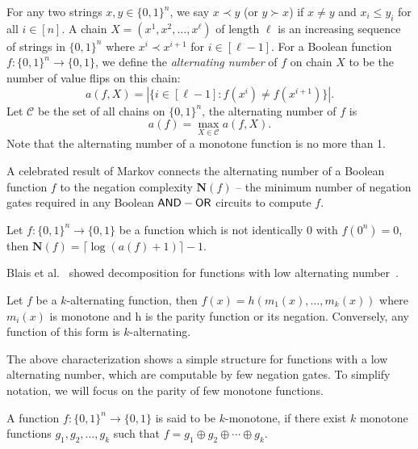 \documentclass{toc}
\newcommand{\cC}{\mathcal{C}}
\begin{document}
%
%
For any two strings $x, y \in \{0, 1\}^n$, we say $x \prec y$
(or $y \succ x$) %
%
if   %
$x \neq y$ and $x_i \le y_i$ for all $i \in [n]$. 
A chain $X = (x^1, x^2, \dots, x^\ell)$ of length $\ell$ is an increasing sequence of strings in $\{0, 1\}^n$
where $x^i \prec x^{i+1}$ for $i \in [\ell - 1]$.
For a Boolean function $f:\{0,1\}^n\rightarrow \{0, 1\}$, we define the 
\emph{alternating number} %
of $f$
on chain $X$ to be the number of value flips on this chain:
\begin{equation}
a(f, X) = \left| \{i \in [\ell - 1] : f(x^i) \neq f(x^{i+1})\}\right|.
\end{equation}
Let $\cC$ be the set of all chains on $\{0, 1\}^n$, the alternating number of $f$ is
\begin{equation}
a(f) = \max_{X \in \cC} a(f, X).
\end{equation}
Note that the alternating number of a monotone function is no more than 1.

A celebrated result of Markov connects the alternating number of a Boolean function $f$ to the
negation complexity $\mathbf{N}(f)$ -- the minimum number of negation gates required in any
Boolean $\sf{AND}-\sf{OR}$ circuits to compute $f$.

\begin{theorem}\label{thm:markov}
Let $f:\{0,1\}^n \rightarrow \{0, 1\}$ be a function which is not identically $0$ with $f(0^n) = 0$,
then $\mathbf{N}(f) = \lceil\log(a(f) + 1)\rceil - 1$.
\end{theorem}

Blais et al.~\cite{BCOST15} showed decomposition for functions with low alternating number~\cite{BCOST15}.
\begin{theorem}
Let $f$ be a $k$-alternating function, then $f(x) = h(m_1(x),\dots, m_k(x))$
where $m_i(x)$ is monotone and h is the parity function or its negation. Conversely, any
function of this form is $k$-alternating.
\end{theorem}

The above characterization shows a simple structure for functions with a low alternating number,
which are computable by few negation gates.
To simplify notation, %
we will %
focus on the parity of few monotone functions.

\begin{definition} 
A function $f:\{0,1\}^n\rightarrow\{0,1\}$ is said to be $k$-monotone, if there exist
$k$ monotone functions $g_1, g_2, \dots, g_k$ such that $f = g_1 \oplus g_2 \oplus \cdots \oplus g_k$. 

\end{definition}
\end{document}
